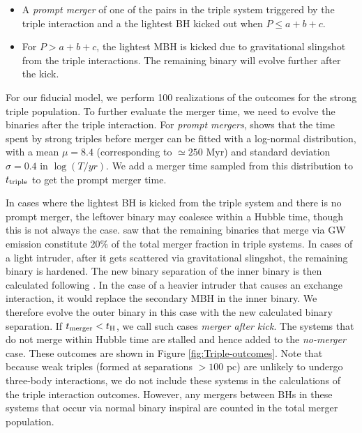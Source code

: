 \documentclass[twocolumn,linenumbers]{aastex701}
\begin{document}
\begin{itemize}
    \item A \emph{prompt merger} of one of the pairs in the triple system triggered by the triple interaction and a the lightest BH kicked out when $P \leq a+b+c$. 

    \item For $P > a+b+c$, the lightest MBH is kicked due to gravitational slingshot from the triple interactions. The remaining binary will evolve further after the kick.
\end{itemize}

For our fiducial model, we perform 100 realizations of the outcomes for the strong triple population. To further evaluate the merger time, we need to evolve the binaries after the triple interaction. For \emph{prompt mergers}, \citet{bonetti_post-newtonian_2018-1} shows that the time spent by strong triples before merger can be fitted with a log-normal distribution, with a mean $\mu = 8.4$ (corresponding to $\simeq 250$ Myr) and standard deviation $\sigma = 0.4$ in $\log(T/yr)$. We add a merger time sampled from this distribution to $t_{\rm triple}$ to get the prompt merger time.

In cases where the lightest BH is kicked from the triple system and there is no prompt merger, the leftover binary may coalesce within a Hubble time, though this is not always the case. \citet{bonetti_post-newtonian_2018-1} saw that the remaining binaries that merge via GW emission constitute  20\% of the total merger fraction in triple systems. In cases of a light intruder, after it gets scattered via gravitational slingshot, the remaining binary is hardened. The new binary separation of the inner binary is then calculated following \citet{volonteri_assembly_2003}. In the case of a heavier intruder that causes an exchange interaction, it would replace the secondary MBH in the inner binary. We therefore evolve the outer binary in this case with the new calculated binary separation. If $t_{\rm merger}<t_{\rm H}$, we call such cases \emph{merger after kick}. The systems that do not merge within Hubble time are stalled and hence added to the \emph{no-merger} case. These outcomes are shown in Figure \ref{fig:Triple-outcomes}. Note that because weak triples (formed at separations $>100$ pc) are unlikely to undergo three-body interactions, we do not include these systems in the calculations of the triple interaction outcomes. However, any mergers between BHs in these systems that occur via normal binary inspiral are counted in the total merger population.
\end{document}
